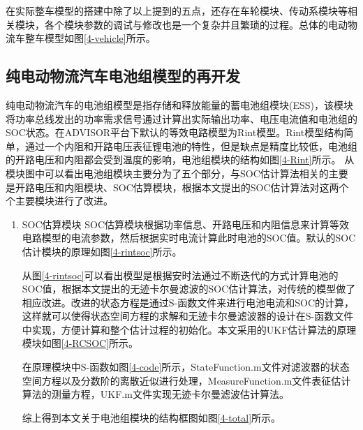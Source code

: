 在实际整车模型的搭建中除了以上提到的五点，还存在车轮模块、传动系模块等相关模块，各个模块参数的调试与修改也是一个复杂并且繁琐的过程。总体的电动物流车整车模型如图\ref{4-vehicle}所示。

\subsection{纯电动物流汽车电池组模型的再开发}
纯电动物流汽车的电池组模型是指存储和释放能量的蓄电池组模块(ESS)，该模块将功率总线发出的功率需求信号通过计算出实际输出功率、电压电流值和电池组的SOC状态。在ADVISOR平台下默认的等效电路模型为Rint模型。Rint模型结构简单，通过一个内阻和开路电压表征锂电池的特性，但是缺点是精度比较低，电池组的开路电压和内阻都会受到温度的影响，电池组模块的结构如图\ref{4-Rint}所示。
从模块图中可以看出电池组模块主要分为了五个部分，与SOC估计算法相关的主要是开路电压和内阻模块、SOC估算模块，根据本文提出的SOC估计算法对这两个个主要模块进行了改进。
\begin{enumerate}
电池组开路电压和内阻的关系是通过等效电路方程计算表征的，本模块通过需求功率值和当前电池组的SOC值，计算得到电池组的开路电压和内阻大小， 模块原理图如图\ref{4-neizu}所示。

该模块输入为SOC值、温度值和需求功率值，通过查表得到电池的开路电压，然后根据功率的正负判断充电还是放电，并且依据充放电选取不同的方法得到电池的内阻。本文采用的锂电池的二阶RC模型，所以在以上模型的基础上进行二阶RC等效电路模型的修改，修改后的二阶RC内阻模型的原理框图如图\ref{4-rc}所示。

\item SOC估算模块
SOC估算模块根据功率信息、开路电压和内阻信息来计算等效电路模型的电流参数，然后根据实时电流计算此时电池的SOC值。默认的SOC估计模块的原理如图\ref{4-rintsoc}所示。

从图\ref{4-rintsoc}可以看出模型是根据安时法通过不断迭代的方式计算电池的SOC值，根据本文提出的无迹卡尔曼滤波的SOC估计算法，对传统的模型做了相应改进。改进的状态方程是通过S-函数文件来进行电池电流和SOC的计算，这样就可以使得状态空间方程的求解和无迹卡尔曼滤波器的设计在S-函数文件中实现，方便计算和整个估计过程的初始化。本文采用的UKF估计算法的原理模块如图\ref{4-RCSOC}所示。

在原理模块中S-函数如图\ref{4-code}所示，StateFunction.m文件对滤波器的状态空间方程以及分数阶的离散近似进行处理，MeasureFunction.m文件表征估计算法的测量方程，UKF.m文件实现无迹卡尔曼滤波估计算法。

综上得到本文关于电池组模块的结构框图如图\ref{4-total}所示。

\end{enumerate}

